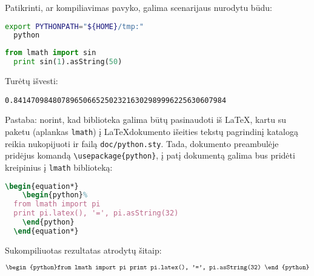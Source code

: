 Patikrinti, ar kompiliavimas pavyko, galima scenarijaus nurodytu būdu:
\begin{lstlisting}[language=bash]
  export PYTHONPATH="${HOME}/tmp:"
  python
\end{lstlisting}
\begin{lstlisting}[language=python]
  from lmath import sin
  print sin(1).asString(50)
\end{lstlisting}
Turėtų išvesti:
\begin{verbatim}
0.8414709848078965066525023216302989996225630607984
\end{verbatim}

Pastaba: norint, kad biblioteka galima būtų pasinaudoti iš \LaTeX, 
kartu su paketu (aplankas \verb|lmath|) į \LaTeX dokumento išeities
tekstų pagrindinį katalogą reikia nukopijuoti ir failą 
\verb|doc/python.sty|. Tada, dokumento preambulėje pridėjus
komandą \verb|\usepackage{python}|, į patį dokumentą galima bus pridėti
kreipinius į \verb|lmath| biblioteką: 
\begin{lstlisting}[language=tex]
  \begin{equation*}
    \begin{python}%
  from lmath import pi
  print pi.latex(), '=', pi.asString(32)
    \end{python}
  \end{equation*}
\end{lstlisting}

Sukompiliuotas rezultatas atrodytų šitaip:

\begin{equation*}
  \begin{python}%
from lmath import pi
print pi.latex(), '=', pi.asString(32)
  \end{python}
\end{equation*}
